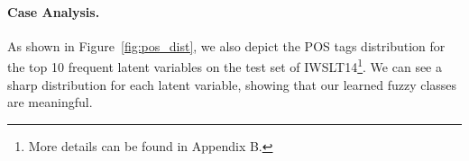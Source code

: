 \paragraph{Case Analysis.} 
As shown in Figure~\ref{fig:pos_dist}, we also depict the POS tags distribution for the top 10 frequent latent variables on the test set of IWSLT14\footnote{More details can be found in Appendix B.}. 
We can see a sharp distribution for each latent variable, showing that our learned fuzzy classes are meaningful. 


